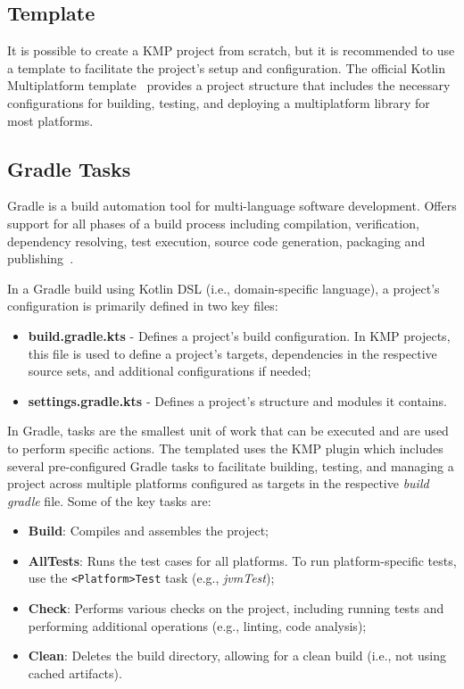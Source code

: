 \subsection{Template}\label{subsec:template}

It is possible to create a KMP project from scratch, but it is recommended to use a template to facilitate the project's setup and configuration.
The official Kotlin Multiplatform template~\cite{kmp-github-template} provides a project structure
that includes the necessary configurations for building,
testing,
and deploying a multiplatform library for most platforms.

\subsection{Gradle Tasks}\label{subsec:available-gradle-tasks}

Gradle is a build automation tool for multi-language software development.
Offers support for all phases of a build process including compilation, verification, dependency resolving, test execution, source code generation, packaging and publishing~\cite{gradle}.

In a Gradle build using Kotlin DSL (i.e., domain-specific language), a project's configuration is primarily defined in two key files:

\begin{itemize}
    \item \textbf{build.gradle.kts} - Defines a project's build configuration.
    In KMP projects, this file is used to define a project's targets, dependencies in the respective source sets, and additional configurations if needed;
    \item \textbf{settings.gradle.kts} - Defines a project's structure and modules it contains.
\end{itemize}

In Gradle, tasks are the smallest unit of work that can be executed and are used to perform specific actions.
The templated uses the KMP plugin which includes several pre-configured Gradle tasks to facilitate building, testing,
and managing a project across multiple platforms configured as targets in the respective \textit{build gradle} file.
Some of the key tasks are:

\begin{itemize}
    \item \textbf{Build}: Compiles and assembles the project;
    \item \textbf{AllTests}: Runs the test cases for all platforms.
    To run platform-specific tests, use the \texttt{<Platform>Test} task (e.g., \textit{jvmTest});
    \item \textbf{Check}: Performs various checks on the project, including running tests and performing additional operations (e.g., linting, code analysis);
    \item \textbf{Clean}: Deletes the build directory, allowing for a clean build (i.e., not using cached artifacts).
\end{itemize}

